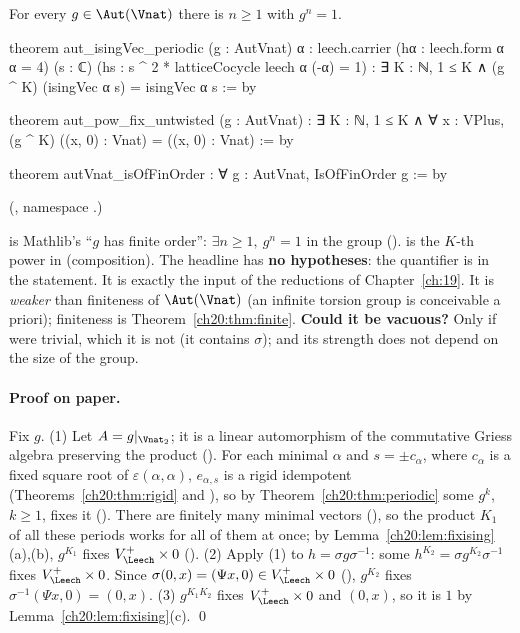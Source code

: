 \begin{theorem}\label{ch20:thm:finorder}
For every $g\in\Aut(\Vnat)$ there is $n\ge1$ with $g^n=1$.
\end{theorem}
\begin{leancode}
theorem aut_isingVec_periodic (g : AutVnat) {α : leech.carrier}
    (hα : leech.form α α = 4) (s : ℂ)
    (hs : s ^ 2 * latticeCocycle leech α (-α) = 1) :
    ∃ K : ℕ, 1 ≤ K ∧ (g ^ K) (isingVec α s) = isingVec α s := by

theorem aut_pow_fix_untwisted (g : AutVnat) :
    ∃ K : ℕ, 1 ≤ K ∧ ∀ x : VPlus, (g ^ K) ((x, 0) : Vnat) = ((x, 0) : Vnat) := by

theorem autVnat_isOfFinOrder : ∀ g : AutVnat, IsOfFinOrder g := by
\end{leancode}
(, namespace .)
\begin{dictionary}
 is Mathlib's ``$g$ has finite order'': $\exists n\ge1,\ g^n=1$ in the group 
().   is the $K$-th power in  (composition).  The headline has
\textbf{no hypotheses}: the quantifier  is in the statement.  It is exactly the input
 of the reductions of Chapter~\ref{ch:19}.  It is \emph{weaker} than finiteness of $\Aut(\Vnat)$ (an infinite
torsion group is conceivable a priori); finiteness is Theorem~\ref{ch20:thm:finite}.  \textbf{Could it be vacuous?}  Only if
 were trivial, which it is not (it contains $\sigma$); and its strength does not depend on the size of the group.
\end{dictionary}
\paragraph{Proof on paper.}  Fix $g$.  (1) Let $A=g|_{\Vnat_2}$; it is a linear automorphism of the commutative Griess
algebra preserving the product ().  For each minimal $\alpha$ and $s=\pm c_\alpha$, where $c_\alpha$
is a fixed square root of $\varepsilon(\alpha,\alpha)$, $e_{\alpha,s}$ is a rigid idempotent (Theorems~\ref{ch20:thm:rigid} and
), so by Theorem~\ref{ch20:thm:periodic} some $g^{k}$, $k\ge1$, fixes it
().  There are finitely many minimal vectors (), so the product
$K_1$ of all these periods works for all of them at once; by Lemma~\ref{ch20:lem:fixising}(a),(b), $g^{K_1}$ fixes
$\chtwentyVL\times0$ ().  (2) Apply (1) to $h=\sigma g\sigma^{-1}$: some $h^{K_2}=\sigma g^{K_2}\sigma^{-1}$
fixes $\chtwentyVL\times0$.  Since $\sigma(0,x)=(\Psi x,0)\in\chtwentyVL\times0$ (), $g^{K_2}$ fixes
$\sigma^{-1}(\Psi x,0)=(0,x)$.  (3) $g^{K_1K_2}$ fixes $\chtwentyVL\times0$ and $(0,x)$, so it is $1$ by
Lemma~\ref{ch20:lem:fixising}(c). \qed

